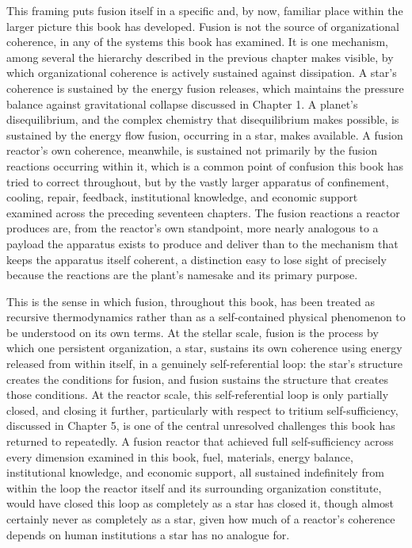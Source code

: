 This framing puts fusion itself in a specific and, by now, familiar place within the larger picture this book has developed. Fusion is not the source of organizational coherence, in any of the systems this book has examined. It is one mechanism, among several the hierarchy described in the previous chapter makes visible, by which organizational coherence is actively sustained against dissipation. A star's coherence is sustained by the energy fusion releases, which maintains the pressure balance against gravitational collapse discussed in Chapter 1. A planet's disequilibrium, and the complex chemistry that disequilibrium makes possible, is sustained by the energy flow fusion, occurring in a star, makes available. A fusion reactor's own coherence, meanwhile, is sustained not primarily by the fusion reactions occurring within it, which is a common point of confusion this book has tried to correct throughout, but by the vastly larger apparatus of confinement, cooling, repair, feedback, institutional knowledge, and economic support examined across the preceding seventeen chapters. The fusion reactions a reactor produces are, from the reactor's own standpoint, more nearly analogous to a payload the apparatus exists to produce and deliver than to the mechanism that keeps the apparatus itself coherent, a distinction easy to lose sight of precisely because the reactions are the plant's namesake and its primary purpose.

This is the sense in which fusion, throughout this book, has been treated as recursive thermodynamics rather than as a self-contained physical phenomenon to be understood on its own terms. At the stellar scale, fusion is the process by which one persistent organization, a star, sustains its own coherence using energy released from within itself, in a genuinely self-referential loop: the star's structure creates the conditions for fusion, and fusion sustains the structure that creates those conditions. At the reactor scale, this self-referential loop is only partially closed, and closing it further, particularly with respect to tritium self-sufficiency, discussed in Chapter 5, is one of the central unresolved challenges this book has returned to repeatedly. A fusion reactor that achieved full self-sufficiency across every dimension examined in this book, fuel, materials, energy balance, institutional knowledge, and economic support, all sustained indefinitely from within the loop the reactor itself and its surrounding organization constitute, would have closed this loop as completely as a star has closed it, though almost certainly never as completely as a star, given how much of a reactor's coherence depends on human institutions a star has no analogue for.

